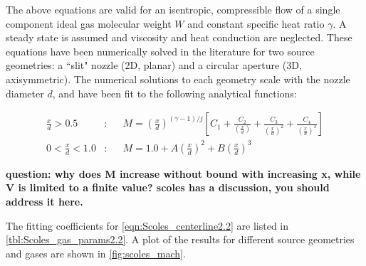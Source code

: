 The above equations are valid for an isentropic, compressible flow of a single component ideal gas molecular weight $W$ and constant specific heat ratio $\gamma$. A steady state is assumed and viscosity and heat conduction are neglected. These equations have been numerically solved in the literature for two source geometries: a ``slit" nozzle (2D, planar) and a circular aperture (3D, axisymmetric). The numerical solutions to each geometry scale with the nozzle diameter $d$, and have been fit to the following analytical functions:

\begin{subequations}
	\label{eqn:Scoles_centerline2.2}
	\begin{align}
	\frac{x}{d} > 0.5&: &&M = \left( \frac{x}{d} \right)^{(\gamma-1)/j} \left[ C_1 + \frac{C_2}{\left(\frac{x}{d}\right)} + \frac{C_3}{\left(\frac{x}{d}\right)^2} + \frac{C_4}{\left(\frac{x}{d}\right)^3} \right] \label{eqn:Scoles_centerline1} \\
	0 < \frac{x}{d} < 1.0&: &&M = 1.0 + A \left( \frac{x}{d} \right)^2 + B \left( \frac{x}{d} \right)^3 \label{eqn:Scoles_centerline2}
	\end{align}
\end{subequations}

\textbf{question: why does M increase without bound with increasing x, while V is limited to a finite value? scoles has a discussion, you should address it here.}

The fitting coefficients for \cref{eqn:Scoles_centerline2.2} are listed in \cref{tbl:Scoles_gas_params2.2}. A plot of the results for different source geometries and gases are shown in \cref{fig:scoles_mach}.


